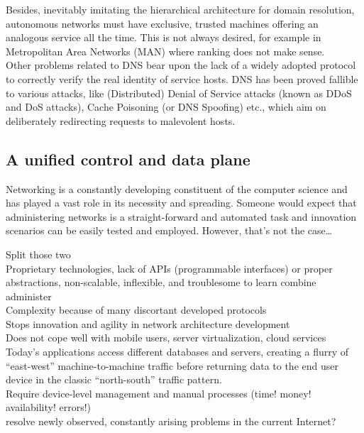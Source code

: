 \documentclass[12pt,a4paper,oneside]{article}
\begin{document}
\indent Besides, inevitably imitating the hierarchical architecture for domain resolution, autonomous networks must have exclusive, trusted machines offering an analogous service all the time. This is not always desired, for example in Metropolitan Area Networks (MAN)  where ranking does not make sense.\\
\indent Other problems related to DNS bear upon the lack of a widely adopted protocol to correctly verify the real identity of service hosts. DNS has been proved fallible to various attacks, like (Distributed) Denial of Service attacks (known as DDoS  and DoS   attacks), Cache Poisoning (or DNS Spoofing) etc., which aim on deliberately redirecting requests to malevolent hosts.

\newpage
\subsection{A unified control and data plane}
Networking is a constantly developing constituent of the computer science and has played a vast role in its necessity and spreading. Someone would expect that administering networks is a straight-forward and automated task and innovation scenarios can be easily tested and employed. However, that's not the case\ldots \\
\indent 


Split those two
\\Proprietary technologies, lack of APIs (programmable interfaces) or proper abstractions, non-scalable, inflexible, and troublesome to learn combine administer
\\Complexity because of many discortant developed protocols
\\Stops innovation and agility in network architecture development
\\Does not cope well with mobile users, server virtualization, cloud services
\\Today’s applications access different databases and servers, creating a flurry of “east-west” machine-to-machine traffic before returning data to the end user device in the classic “north-south” traffic pattern.
\\Require device-level management and manual processes (time! money! availability! errors!)
\\resolve newly observed, constantly arising problems in the current Internet?
\end{document}
